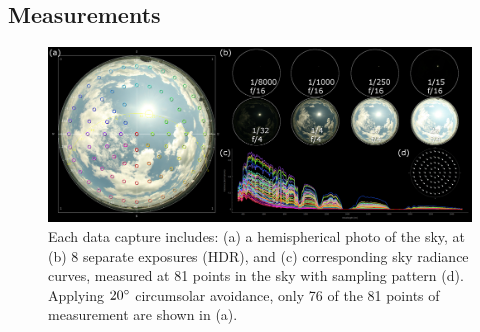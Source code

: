 \subsection{Measurements}
\label{sec:measurements}

\begin{figure}[hbtp]
\begin{center}
\includegraphics[width=1.0\textwidth]{img/data_measurements.jpg}
\end{center}
\caption{\label{fig:measurements}Each data capture includes: (a) a hemispherical photo of the sky, at (b) 8 separate exposures (HDR), and (c) corresponding sky radiance curves, measured at 81 points in the sky with sampling pattern (d). Applying $20\degree$ circumsolar avoidance, only 76 of the 81 points of measurement are shown in (a).}
\end{figure}



